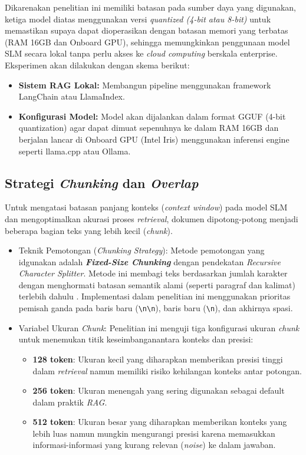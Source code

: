 Dikarenakan penelitian ini memiliki batasan pada sumber daya yang digunakan, ketiga model diatas menggunakan versi \textit{quantized (4-bit atau 8-bit)} untuk memastikan supaya dapat dioperasikan dengan batasan memori yang terbatas (RAM 16GB dan Onboard GPU), sehingga memungkinkan penggunaan model SLM secara lokal tanpa perlu akses ke \textit{cloud computing} berskala enterprise.
Eksperimen akan dilakukan dengan skema berikut:
\begin{itemize}
    \item \textbf{Sistem RAG Lokal:} Membangun pipeline menggunakan framework LangChain atau LlamaIndex.
    \item \textbf{Konfigurasi Model:} Model akan dijalankan dalam format GGUF (4-bit quantization) agar dapat dimuat sepenuhnya ke dalam RAM 16GB dan berjalan lancar di Onboard GPU (Intel Iris) menggunakan inferensi engine seperti llama.cpp atau Ollama.
\end{itemize}

\subsection{Strategi \textit{Chunking} dan \textit{Overlap}}
Untuk mengatasi batasan panjang konteks (\textit{context window}) pada model SLM dan mengoptimalkan akurasi proses \textit{retrieval}, dokumen dipotong-potong menjadi beberapa bagian teks yang lebih kecil (\textit{chunk}).
\begin{itemize}
  \item Teknik Pemotongan (\textit{Chunking Strategy}): Metode pemotongan yang idgunakan adalah \textbf{\textit{Fixed-Size Chunking}} dengan pendekatan \textit{Recursive Character Splitter}. Metode ini membagi teks berdasarkan jumlah karakter dengan menghormati batasan semantik alami (seperti paragraf dan kalimat) terlebih dahulu \citep{langchain2025splitter}. Implementasi dalam penelitian ini menggunakan prioritas pemisah ganda pada baris baru (\texttt{\textbackslash n\textbackslash n}), baris baru (\texttt{\textbackslash n}), dan akhirnya spasi.
  \item Variabel Ukuran \textit{Chunk}: Penelitian ini menguji tiga konfigurasi ukuran \textit{chunk} untuk menemukan titik keseimbanganantara konteks dan presisi:
    \begin{itemize}
        \item \textbf{128 token}: Ukuran kecil yang diharapkan memberikan presisi tinggi dalam \textit{retrieval} namun memiliki risiko kehilangan konteks antar potongan.
        \item \textbf{256 token}: Ukuran menengah yang sering digunakan sebagai default dalam praktik \textit{RAG}.
        \item \textbf{512 token}: Ukuran besar yang diharapkan memberikan konteks yang lebih luas namun mungkin mengurangi presisi karena memasukkan informasi-informasi yang kurang relevan (\textit{noise}) ke dalam jawaban.
    \end{itemize}
\end{itemize}

